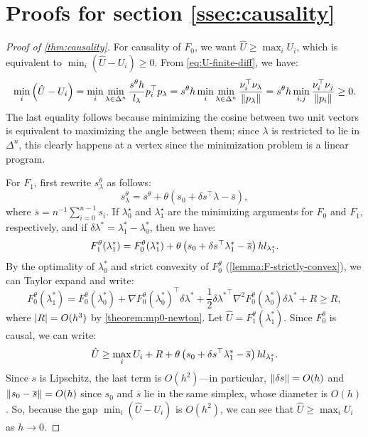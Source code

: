 \documentclass[sisc-eikonal.tex]{subfiles}
\begin{document}
\section{Proofs for section \ref{ssec:causality}}

\begin{proof}[Proof of \cref{thm:causality}]
  For causality of $F_0$, we want $\hat{U} \geq \max_i U_i$, which is
  equivalent to $\min_i(\hat{U} - U_i) \geq 0$. From
  \cref{eq:U-finite-diff}, we have:
  \begin{equation}
    \min_i \left(\hat{U} - U_i\right) = \min_i \min_{\lambda \in \Delta^n} \frac{s^\theta h}{l_\lambda} p_i^\top p_\lambda = s^\theta h \min_i \min_{\lambda \in \Delta^n} \frac{\nu_i^\top \nu_{\lambda}}{\left\|p_\lambda\right\|} = s^\theta h \min_{i, j} \frac{\nu_i^\top \nu_j}{\left\|p_i\right\|} \geq 0.
  \end{equation}
  The last equality follows because minimizing the cosine between two
  unit vectors is equivalent to maximizing the angle between them;
  since $\lambda$ is restricted to lie in $\Delta^n$, this clearly
  happens at a vertex since the minimization problem is a linear
  program.

  For $F_1$, first rewrite $s_\lambda^\theta$ as follows:
  \begin{equation}
    s_\lambda^\theta = s^\theta + \theta (s_0 + \delta s^\top \lambda - \overline{s}),
  \end{equation}
  where $\overline{s} = n^{-1} \sum_{i=0}^{n-1} s_i$. If
  $\lambda_0^\star$ and $\lambda_1^\star$ are the minimizing arguments
  for $F_0$ and $F_1$, respectively, and if
  $\delta \lambda^* = \lambda_1^* - \lambda_0^*$, then we have:
  \begin{equation}
    F_1^\theta(\lambda_1^*) = F_0^\theta(\lambda_1^*) + \theta \left(s_0 + \delta s^\top \lambda_1^* - \overline{s}\right) h l_{\lambda_1^\star}.
  \end{equation}
  By the optimality of $\lambda_0^*$ and strict convexity of
  $F_0^\theta$ (\cref{lemma:F-strictly-convex}), we can Taylor expand
  and write:
  \begin{equation}
    F_0^\theta(\lambda_1^*) = F_0^\theta(\lambda_0^*) + \nabla F_0^\theta(\lambda_0^*)^\top \delta \lambda^* + \frac{1}{2} {\delta \lambda^*}^\top \nabla^2 F_0^\theta(\lambda_0^*) \delta \lambda^* + R \geq R,
  \end{equation}
  where $\left|R\right| = O(h^3)$ by \cref{theorem:mp0-newton}. Let
  $\hat{U} = F_1^\theta(\lambda_1^*)$. Since $F_0^\theta$ is causal,
  we can write:
  \begin{equation}
    \hat{U} \geq \max_i U_i + R + \theta \left(s_0 + \delta s^\top \lambda_1^* - \overline{s}\right) h l_{\lambda_1^*}.
  \end{equation}
  Since $s$ is Lipschitz, the last term is $O(h^2)$---in particular,
  $\left\|\delta s\right\| = O(h)$ and $\left\|s_0 - \overline{s}\right\| = O(h)$
  since $s_0$ and $\overline{s}$ lie in the same simplex, whose
  diameter is $O(h)$. So, because the gap $\min_i(\hat{U} - U_i)$ is
  $O(h^2)$, we can see that $\hat{U} \geq \max_i U_i$ as $h \to 0$.
\end{proof}
\end{document}
